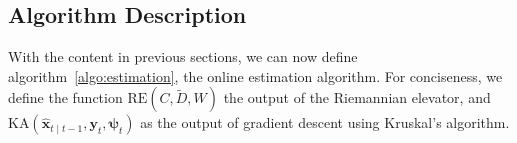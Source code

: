 

\subsection{Algorithm Description}
With the content in previous sections, we can now define algorithm~\ref{algo:estimation}, the online estimation algorithm. For conciseness, we define the function $\text{RE}(C, \tilde{D}, W)$ the output of the Riemannian elevator, and $\text{KA}(\hat{\mathbf{x}}_{t \mid t-1}, \mathbf{y}_t, \bm{\psi}_t)$ as the output of gradient descent using Kruskal's algorithm. 



